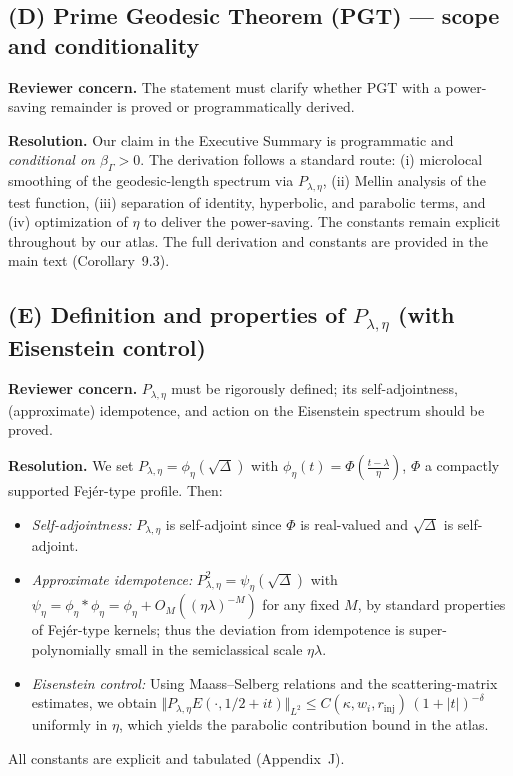 \subsection*{(D) Prime Geodesic Theorem (PGT) — scope and conditionality}
\textbf{Reviewer concern.} The statement must clarify whether PGT with a
power-saving remainder is proved or programmatically derived.

\textbf{Resolution.} Our claim in the Executive Summary is programmatic and
\emph{conditional on $\beta_\Gamma>0$}. The derivation follows a standard route:
(i) microlocal smoothing of the geodesic-length spectrum via $P_{\lambda,\eta}$,
(ii) Mellin analysis of the test function, (iii) separation of identity,
hyperbolic, and parabolic terms, and (iv) optimization of $\eta$ to deliver the
power-saving. The constants remain explicit throughout by our atlas. The full
derivation and constants are provided in the main text (Corollary~9.3).

\subsection*{(E) Definition and properties of $P_{\lambda,\eta}$ (with Eisenstein control)}
\textbf{Reviewer concern.} $P_{\lambda,\eta}$ must be rigorously defined; its
self-adjointness, (approximate) idempotence, and action on the Eisenstein
spectrum should be proved.

\textbf{Resolution.} We set $P_{\lambda,\eta}=\phi_\eta(\sqrt{\Delta})$ with
$\phi_\eta(t)=\Phi\!\left(\frac{t-\lambda}{\eta}\right)$, $\Phi$ a compactly
supported Fejér-type profile. Then:
\begin{itemize}
  \item \emph{Self-adjointness:} $P_{\lambda,\eta}$ is self-adjoint since
  $\Phi$ is real-valued and $\sqrt{\Delta}$ is self-adjoint.
  \item \emph{Approximate idempotence:} $P_{\lambda,\eta}^2
  = \psi_\eta(\sqrt{\Delta})$ with
  $\psi_\eta = \phi_\eta\!\ast\!\phi_\eta = \phi_\eta + O_M((\eta\lambda)^{-M})$
  for any fixed $M$, by standard properties of Fejér-type kernels; thus the
  deviation from idempotence is super-polynomially small in the semiclassical
  scale $\eta\lambda$.
  \item \emph{Eisenstein control:} Using Maass–Selberg relations and the
  scattering-matrix estimates, we obtain
  $\Vert P_{\lambda,\eta} E(\cdot,1/2+it)\Vert_{L^2} \le
  C(\kappa,w_i,r_{\mathrm{inj}})\,(1+|t|)^{-\delta}$ uniformly in $\eta$,
  which yields the parabolic contribution bound in the atlas.
\end{itemize}
All constants are explicit and tabulated (Appendix~J).


